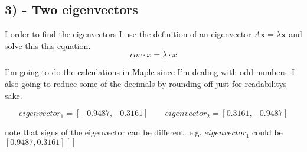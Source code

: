 \subsection{3) - Two eigenvectors}
I order to find the eigenvectors I use the definition of an eigenvector $A\bar{\textbf{x}} = \lambda\bar{\textbf{x}}$
and solve this this equation.
$$cov \cdot \bar{x} = \lambda \cdot \bar{x}$$

I'm going to do the calculations in Maple since I'm dealing with odd numbers. I also going to
reduce some of the decimals by rounding off just for readabilitys sake.

$$eigenvector_1 = [-0.9487, -0.3161] \quad \quad eigenvector_2 = [0.3161, -0.9487]$$

\noindent note that signs of the eigenvector can be different. e.g. $eigenvector_1$ could be $[0.9487, 0.3161][]$